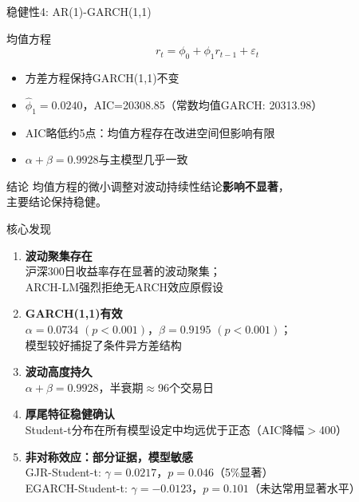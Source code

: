 \documentclass[10pt,aspectratio=169]{beamer}
\begin{document}
\begin{frame}{稳健性4: AR(1)-GARCH(1,1)}
  \begin{block}{均值方程}
    \[ r_t = \phi_0 + \phi_1 r_{t-1} + \varepsilon_t \]
  \end{block}
  \begin{itemize}
    \item 方差方程保持GARCH(1,1)不变
    \item $\hat{\phi}_1=0.0240$，AIC=20308.85（常数均值GARCH: 20313.98）
    \item AIC略低约5点：均值方程存在改进空间但影响有限
    \item $\alpha+\beta=0.9928$与主模型几乎一致
  \end{itemize}
  \begin{block}{结论}
    均值方程的微小调整对波动持续性结论\textbf{影响不显著}，\\
    主要结论保持稳健。
  \end{block}
\end{frame}

\begin{frame}{核心发现}
  \begin{enumerate}
    \item \textbf{波动聚集存在}\\
    沪深300日收益率存在显著的波动聚集；\\
    ARCH-LM强烈拒绝无ARCH效应原假设

    \item \textbf{GARCH(1,1)有效}\\
    $\alpha=0.0734$ $(p<0.001)$，$\beta=0.9195$ $(p<0.001)$；\\
    模型较好捕捉了条件异方差结构

    \item \textbf{波动高度持久}\\
    $\alpha+\beta=0.9928$，半衰期$\approx$96个交易日

    \item \textbf{厚尾特征稳健确认}\\
    Student-t分布在所有模型设定中均远优于正态（AIC降幅$>$400）

    \item \textbf{非对称效应：部分证据，模型敏感}\\
    GJR-Student-t: $\gamma=0.0217$，$p=0.046$（5\%显著）\\
    EGARCH-Student-t: $\gamma=-0.0123$，$p=0.101$（未达常用显著水平）
  \end{enumerate}
\end{frame}
\end{document}
